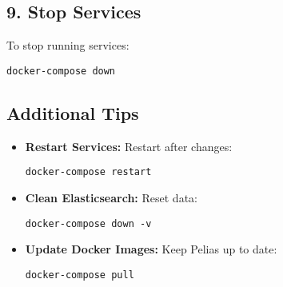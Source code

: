 \documentclass{article}
\begin{document}
\subsection*{9. Stop Services}
To stop running services:
\begin{lstlisting}
docker-compose down
\end{lstlisting}

\subsection*{Additional Tips}
\begin{itemize}
    \item \textbf{Restart Services:} Restart after changes:
    \begin{lstlisting}
docker-compose restart
    \end{lstlisting}
    \item \textbf{Clean Elasticsearch:} Reset data:
    \begin{lstlisting}
docker-compose down -v
    \end{lstlisting}
    \item \textbf{Update Docker Images:} Keep Pelias up to date:
    \begin{lstlisting}
docker-compose pull
    \end{lstlisting}
\end{itemize}
\end{document}
